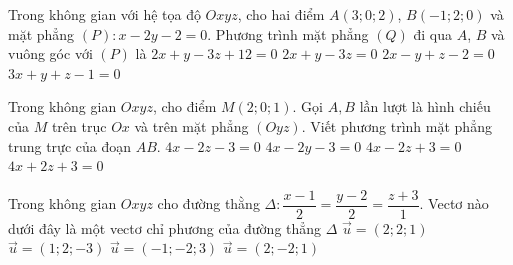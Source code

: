 \begin{ex}%
Trong không gian với hệ tọa độ $O x y z$, cho hai điểm $A (3;0;2) $, $ B(-1;2;0) $ và mặt phẳng $(P)\colon x-2y-2=0$. Phương trình mặt phẳng $(Q)$ đi qua $A$, $B$ và vuông góc với $(P)$ là
\choice
{$2x + y -3z +12 =0$}
{\True $2x + y -3z =0$}
{$2x - y + z -2 =0$}
{$3x + y +z -1 =0$}
\end{ex}

\begin{ex}%
Trong không gian $Oxyz$, cho điểm $M\left( 2;0;1 \right)$. Gọi $A,B$ lần lượt là hình chiếu của $M$ trên trục $Ox$ và trên mặt phẳng $\left( Oyz \right)$. Viết phương trình mặt phẳng trung trực của đoạn $AB$.
\choice
{\True  $4x-2z-3=0$}
{ $4x-2y-3=0$}
{ $4x-2z+3=0$}
{ $4x+2z+3=0$}
\end{ex}

\begin{ex}%
Trong không gian $Oxyz$ cho đường thằng $\Delta: \dfrac{x-1}{2}=\dfrac{y-2}{2}=\dfrac{z+3}{1}$. Vectơ nào dưới đây là một vectơ chỉ phương của đường thẳng $\Delta$
\choice
{\True $\overrightarrow{u}=\left( 2;2;1\right) $}
{$\overrightarrow{u}=\left( 1;2;-3\right) $}
{$\overrightarrow{u}=\left( -1;-2;3\right) $}
{$\overrightarrow{u}=\left( 2;-2;1 \right) $}
\end{ex}


